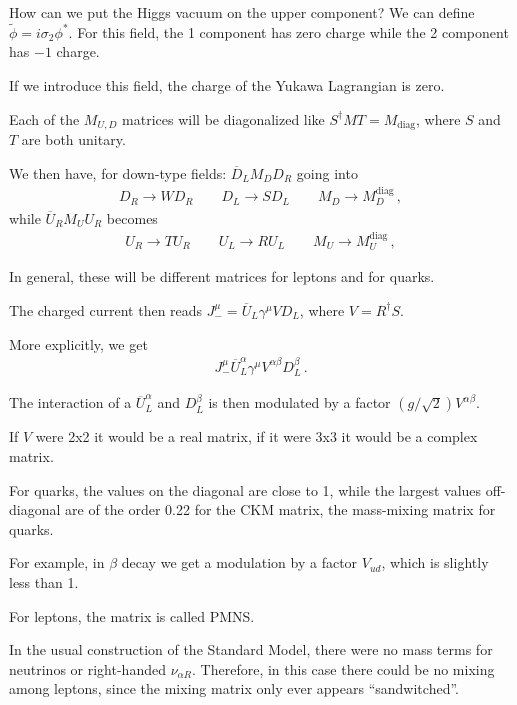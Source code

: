 \documentclass[main.tex]{subfiles}
\begin{document}
How can we put the Higgs vacuum on the upper component? 
We can define \(\widetilde{\phi} = i \sigma _2 \phi^{*}\). 
For this field, the 1 component has zero charge while the 2 component has \(-1\) charge. 

If we introduce this field, the charge of the Yukawa Lagrangian is zero. 

Each of the \(M_{U, D}\) matrices will be diagonalized like \(S ^\dag M T = M _{\text{diag}}\), where \(S\) and \(T\) are both unitary. 

We then have, for down-type fields: \(\overline{D}_L M_D D_R\) going into 
%
\begin{align}
D_R \to W D_R \qquad D_L \to S D_L \qquad M_D \to M_D^{\text{diag}}
\,,
\end{align}
%
while \(\overline{U}_R M_U U_R\) becomes
%
\begin{align}
U_R \to T U_R \qquad U_L \to R U_L \qquad M_U \to M_U^{\text{diag}}
\,,
\end{align}
%


In general, these will be different matrices for leptons and for quarks. 

The charged current then reads \(J^{\mu }_{-} = \overline{U}_L \gamma^{\mu } V D_L\), where \(V = R ^\dag S\). 

More explicitly, we get 
%
\begin{align}
J^{\mu }_{-} \overline{U}^{\alpha }_{L} \gamma^{\mu } V^{\alpha \beta } D^{\beta }_{L}
\,.
\end{align}

The interaction of a \(\overline{U}^{\alpha }_L\) and \(D^{\beta }_{L}\) is then modulated by a factor \((g/\sqrt{2}) V^{\alpha \beta }\). 

If \(V\) were 2x2 it would be a real matrix, if it were 3x3 it would be a complex matrix.

For quarks, the values on the diagonal are close to 1, while the largest values off-diagonal are of the order \num{.22} for the CKM matrix, the mass-mixing matrix for quarks. 

For example, in \(\beta \) decay we get a modulation by a factor \(V_{ud}\), which is slightly less than 1. 

For leptons, the matrix is called PMNS. 

In the usual construction of the Standard Model, there were no mass terms for neutrinos or right-handed \(\nu_{\alpha R}\). 
Therefore, in this case there could be no mixing among leptons, since the mixing matrix only ever appears ``sandwitched''. 
\end{document}

